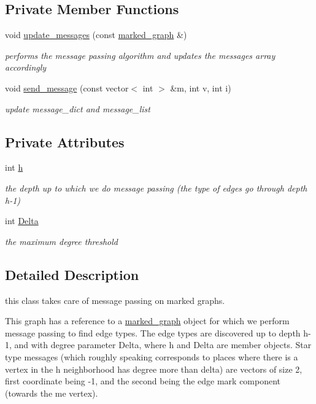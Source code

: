 \subsection*{Private Member Functions}
\begin{DoxyCompactItemize}
\item 
void \hyperlink{classgraph__message_a40dadc59d582b290202e79bc4a9e896c}{update\+\_\+messages} (const \hyperlink{classmarked__graph}{marked\+\_\+graph} \&)
\begin{DoxyCompactList}\small\item\em performs the message passing algorithm and updates the messages array accordingly \end{DoxyCompactList}\item 
void \hyperlink{classgraph__message_aa76d1d5420a12477fa1dddd878d78c8f}{send\+\_\+message} (const vector$<$ int $>$ \&m, int v, int i)
\begin{DoxyCompactList}\small\item\em update message\+\_\+dict and message\+\_\+list \end{DoxyCompactList}\end{DoxyCompactItemize}
\subsection*{Private Attributes}
\begin{DoxyCompactItemize}
\item 
int \hyperlink{classgraph__message_a934d63ed7275c211e13c6fb68824ed46}{h}
\begin{DoxyCompactList}\small\item\em the depth up to which we do message passing (the type of edges go through depth h-\/1) \end{DoxyCompactList}\item 
int \hyperlink{classgraph__message_a45dfd061b7bc73572e5132fbf66efd55}{Delta}
\begin{DoxyCompactList}\small\item\em the maximum degree threshold \end{DoxyCompactList}\end{DoxyCompactItemize}


\subsection{Detailed Description}
this class takes care of message passing on marked graphs. 

This graph has a reference to a \hyperlink{classmarked__graph}{marked\+\_\+graph} object for which we perform message passing to find edge types. The edge types are discovered up to depth h-\/1, and with degree parameter Delta, where h and Delta are member objects. Star type messages (which roughly speaking corresponds to places where there is a vertex in the h neighborhood has degree more than delta) are vectors of size 2, first coordinate being -\/1, and the second being the edge mark component (towards the \textquotesingle{}me\textquotesingle{} vertex).

